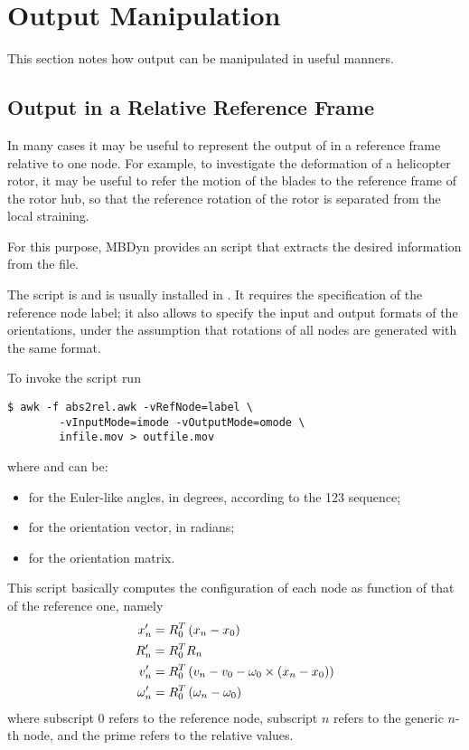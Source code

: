 \section{Output Manipulation}
This section notes how output can be manipulated in useful manners.

\subsection{Output in a Relative Reference Frame}
In many cases it may be useful to represent the output 
of  in a reference frame relative to one node.
For example, to investigate the deformation of a helicopter rotor,
it may be useful to refer the motion of the blades
to the reference frame of the rotor hub, so that the reference 
rotation of the rotor is separated from the local straining.

For this purpose, MBDyn provides an  script that
extracts the desired information from the  file.

The script is 
and is usually installed in .
It requires the specification of the reference node label;
it also allows to specify the input and output formats 
of the orientations, under the assumption that rotations
of all nodes are generated with the same format.

To invoke the script run
\begin{verbatim}
$ awk -f abs2rel.awk -vRefNode=label \
        -vInputMode=imode -vOutputMode=omode \
        infile.mov > outfile.mov
\end{verbatim}
where  and  can be:
\begin{itemize}
\item {} for the Euler-like angles, in degrees,
	according to the 123 sequence;
\item \kw{vector} for the orientation vector, in radians;
\item \kw{matrix} for the orientation matrix.
\end{itemize}

This script basically computes the configuration of each node
as function of that of the reference one, namely
\begin{align}
	x_n' &= R_0^T\left( x_n - x_0 \right) \\
	R_n' &= R_0^T R_n \\
	v_n' &= R_0^T\left( v_n - v_0 - \omega_0\times\left( x_n - x_0 \right) \right) \\
	\omega_n' &= R_0^T\left( \omega_n - \omega_0 \right)
\end{align}
where subscript $0$ refers to the reference node,
subscript $n$ refers to the generic $n$-th node,
and the prime refers to the relative values.
